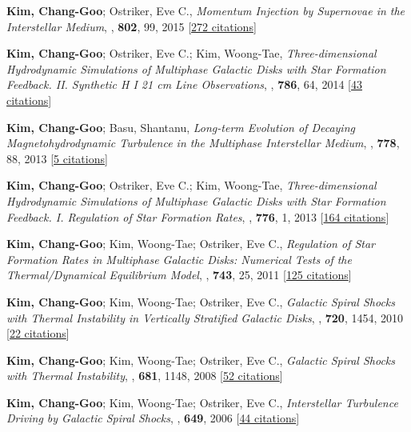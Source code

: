 \item[{8.}]\textbf{Kim, Chang-Goo}; Ostriker, Eve C., \textit{Momentum Injection by Supernovae in the Interstellar Medium}, , \textbf{802}, 99, 2015 [\href{http://adsabs.harvard.edu/abs/2015ApJ...802...99K}{272 citations}]

\item[{7.}]\textbf{Kim, Chang-Goo}; Ostriker, Eve C.; Kim, Woong-Tae, \textit{Three-dimensional Hydrodynamic Simulations of Multiphase Galactic Disks with Star Formation Feedback. II. Synthetic H I 21 cm Line Observations}, , \textbf{786}, 64, 2014 [\href{http://adsabs.harvard.edu/abs/2014ApJ...786...64K}{43 citations}]

\item[{6.}]\textbf{Kim, Chang-Goo}; Basu, Shantanu, \textit{Long-term Evolution of Decaying Magnetohydrodynamic Turbulence in the Multiphase Interstellar Medium}, , \textbf{778}, 88, 2013 [\href{http://adsabs.harvard.edu/abs/2013ApJ...778...88K}{5 citations}]

\item[{5.}]\textbf{Kim, Chang-Goo}; Ostriker, Eve C.; Kim, Woong-Tae, \textit{Three-dimensional Hydrodynamic Simulations of Multiphase Galactic Disks with Star Formation Feedback. I. Regulation of Star Formation Rates}, , \textbf{776}, 1, 2013 [\href{http://adsabs.harvard.edu/abs/2013ApJ...776....1K}{164 citations}]

\item[{4.}]\textbf{Kim, Chang-Goo}; Kim, Woong-Tae; Ostriker, Eve C., \textit{Regulation of Star Formation Rates in Multiphase Galactic Disks: Numerical Tests of the Thermal/Dynamical Equilibrium Model}, , \textbf{743}, 25, 2011 [\href{http://adsabs.harvard.edu/abs/2011ApJ...743...25K}{125 citations}]

\item[{3.}]\textbf{Kim, Chang-Goo}; Kim, Woong-Tae; Ostriker, Eve C., \textit{Galactic Spiral Shocks with Thermal Instability in Vertically Stratified Galactic Disks}, , \textbf{720}, 1454, 2010 [\href{http://adsabs.harvard.edu/abs/2010ApJ...720.1454K}{22 citations}]

\item[{2.}]\textbf{Kim, Chang-Goo}; Kim, Woong-Tae; Ostriker, Eve C., \textit{Galactic Spiral Shocks with Thermal Instability}, , \textbf{681}, 1148, 2008 [\href{http://adsabs.harvard.edu/abs/2008ApJ...681.1148K}{52 citations}]

\item[{1.}]\textbf{Kim, Chang-Goo}; Kim, Woong-Tae; Ostriker, Eve C., \textit{Interstellar Turbulence Driving by Galactic Spiral Shocks}, , \textbf{649}, 2006 [\href{http://adsabs.harvard.edu/abs/2006ApJ...649L..13K}{44 citations}]